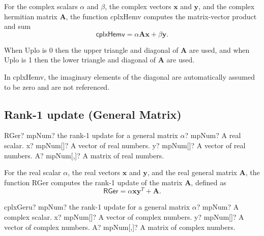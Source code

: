 \vspace{0.3cm}
For the complex scalars $\alpha$ and $\beta$, the complex vectors $\boldsymbol{x}$ and $\boldsymbol{y}$, and the complex hermitian matrix $\boldsymbol{A}$, the function \textsf{cplxHemv} computes the matrix-vector product and sum 
\begin{equation}
\textsf{cplxHemv}= \alpha \boldsymbol{A} \boldsymbol{x} + \beta \boldsymbol{y}.
\end{equation}

When \textsf{Uplo} is 0 then the upper triangle and diagonal of $\boldsymbol{A}$ are used, and when \textsf{Uplo} is 1 then the lower triangle and diagonal of $\boldsymbol{A}$ are used. 

In \textsf{cplxHemv}, the imaginary elements of the diagonal are automatically assumed to be zero and are not referenced. 






\newpage
\subsection{Rank-1 update (General Matrix)}

\begin{mpFunctionsExtract}
	\mpFunctionFour
	{RGer? mpNum? the rank-1 update for a general matrix}
	{$\alpha$? mpNum? A real scalar.}
	{x? mpNum[]? A vector of real numbers.}
	{y? mpNum[]? A vector of real numbers.}
	{A? mpNum[,]? A matrix of real numbers.}
\end{mpFunctionsExtract}

\vspace{0.3cm}
For the real scalar $\alpha$, the real vectors $\boldsymbol{x}$ and $\boldsymbol{y}$, and the real general matrix $\boldsymbol{A}$, the function \textsf{RGer} computes the rank-1 update of the matrix $\boldsymbol{A}$, defined as
\begin{equation}
\textsf{RGer}= \alpha \boldsymbol{x}  \boldsymbol{y}^T +\boldsymbol{A} .
\end{equation}


\vspace{0.6cm}
\begin{mpFunctionsExtract}
	\mpFunctionFour
	{cplxGeru? mpNum? the rank-1 update for a general matrix}
	{$\alpha$? mpNum? A complex scalar.}
	{x? mpNum[]? A vector of complex numbers.}
	{y? mpNum[]? A vector of complex numbers.}
	{A? mpNum[,]? A matrix of complex numbers.}
\end{mpFunctionsExtract}

